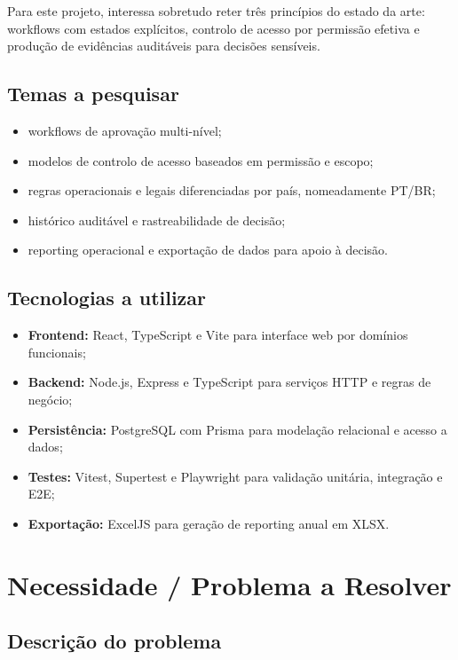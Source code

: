\documentclass[11pt,a4paper,twoside]{article}
\begin{document}
Para este projeto, interessa sobretudo reter três princípios do estado da arte: workflows com estados explícitos, controlo de acesso por permissão efetiva e produção de evidências auditáveis para decisões sensíveis.

\subsection{Temas a pesquisar}

\begin{itemize}
  \item workflows de aprovação multi-nível;
  \item modelos de controlo de acesso baseados em permissão e escopo;
  \item regras operacionais e legais diferenciadas por país, nomeadamente PT/BR;
  \item histórico auditável e rastreabilidade de decisão;
  \item reporting operacional e exportação de dados para apoio à decisão.
\end{itemize}

\subsection{Tecnologias a utilizar}

\begin{itemize}
  \item \textbf{Frontend:} React, TypeScript e Vite para interface web por domínios funcionais;
  \item \textbf{Backend:} Node.js, Express e TypeScript para serviços HTTP e regras de negócio;
  \item \textbf{Persistência:} PostgreSQL com Prisma para modelação relacional e acesso a dados;
  \item \textbf{Testes:} Vitest, Supertest e Playwright para validação unitária, integração e E2E;
  \item \textbf{Exportação:} ExcelJS para geração de reporting anual em XLSX.
\end{itemize}

\section{Necessidade / Problema a Resolver}

\subsection{Descrição do problema}
\end{document}
